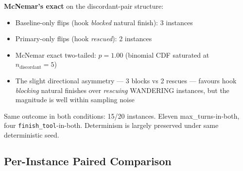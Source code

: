 \documentclass[11pt]{article}
\begin{document}
\textbf{McNemar's exact} on the discordant-pair structure:
\begin{itemize}
\item Baseline-only flips (hook \emph{blocked} natural finish): 3 instances
\item Primary-only flips (hook \emph{rescued}): 2 instances
\item McNemar exact two-tailed: $p = 1.00$ (binomial CDF saturated at $n_{\text{discordant}}=5$)
\item The slight directional asymmetry --- 3 blocks vs 2 rescues --- favours hook \emph{blocking} natural finishes over \emph{rescuing} WANDERING instances, but the magnitude is well within sampling noise
\end{itemize}

Same outcome in both conditions: 15/20 instances. Eleven max\_turns-in-both, four \texttt{finish\_tool}-in-both. Determinism is largely preserved under same deterministic seed.

\subsection{Per-Instance Paired Comparison}
\end{document}
